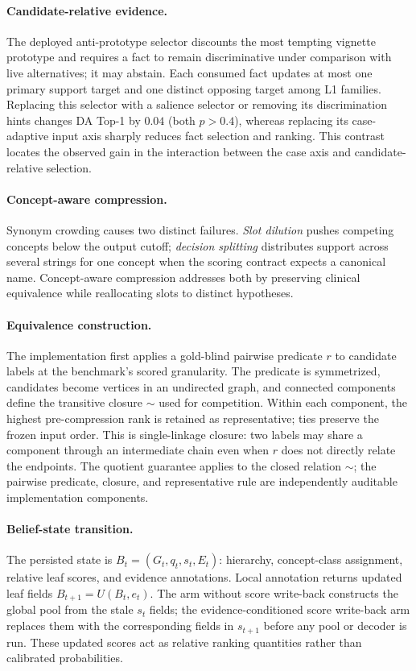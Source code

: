 \documentclass[letterpaper]{article}
\begin{document}
\paragraph{Candidate-relative evidence.}
The deployed anti-prototype selector discounts the most tempting vignette prototype and requires a fact to remain discriminative under comparison with live alternatives; it may abstain.
Each consumed fact updates at most one primary support target and one distinct opposing target among L1 families.
Replacing this selector with a salience selector or removing its discrimination hints changes DA Top-1 by $0.04$ (both $p>0.4$), whereas replacing its case-adaptive input axis sharply reduces fact selection and ranking.
This contrast locates the observed gain in the interaction between the case axis and candidate-relative selection.

\paragraph{Concept-aware compression.}
Synonym crowding causes two distinct failures.
\emph{Slot dilution} pushes competing concepts below the output cutoff; \emph{decision splitting} distributes support across several strings for one concept when the scoring contract expects a canonical name.
Concept-aware compression addresses both by preserving clinical equivalence while reallocating slots to distinct hypotheses.

\paragraph{Equivalence construction.}
The implementation first applies a gold-blind pairwise predicate $r$ to candidate labels at the benchmark's scored granularity.
The predicate is symmetrized, candidates become vertices in an undirected graph, and connected components define the transitive closure $\sim$ used for competition.
Within each component, the highest pre-compression rank is retained as representative; ties preserve the frozen input order.
This is single-linkage closure: two labels may share a component through an intermediate chain even when $r$ does not directly relate the endpoints.
The quotient guarantee applies to the closed relation $\sim$; the pairwise predicate, closure, and representative rule are independently auditable implementation components.

\paragraph{Belief-state transition.}
The persisted state is $B_t=(G_t,q_t,s_t,E_t)$: hierarchy, concept-class assignment, relative leaf scores, and evidence annotations.
Local annotation returns updated leaf fields $B_{t+1}=U(B_t,e_t)$.
The arm without score write-back constructs the global pool from the stale $s_t$ fields; the evidence-conditioned score write-back arm replaces them with the corresponding fields in $s_{t+1}$ before any pool or decoder is run.
These updated scores act as relative ranking quantities rather than calibrated probabilities.
\end{document}
